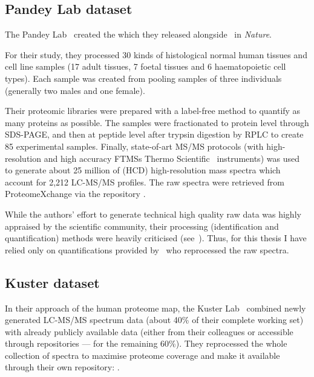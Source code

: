 \subsection{Pandey Lab dataset}

The Pandey Lab~ created the
 which
they released alongside~ in \emph{Nature}.

For their study, they processed 30 kinds of histological normal human
tissues and cell line samples (17 adult tissues, 7 foetal tissues and 6
haematopoietic cell types).
Each sample was created from pooling samples of three
individuals (generally two males and one female).

Their proteomic libraries were prepared with a label-free method to quantify
as many proteins as possible.
The samples were fractionated to protein level through \gls{SDS-PAGE},
and then at peptide level after trypsin digestion by \gls{RPLC}
to create 85 experimental samples.
Finally, state-of-art \gls{MS/MS} protocols
(with high-resolution and high accuracy
\glspl{FTMS} Thermo Scientific \orbi\ instruments)
was used to generate about 25 million of (\gls{HCD})
high-resolution mass spectra which account for 2,212 \gls{LC-MS/MS} profiles.
The raw spectra were retrieved from ProteomeXchange via the repository
.

While the authors' effort to generate technical high quality raw data was highly
appraised by the scientific community, their processing
(identification and quantification) methods were heavily
criticised (see~\citet{Ezkurdia2014-qx,Deutsch2015}).
Thus, for this thesis I have relied only on
quantifications provided by \james\ who reprocessed the raw spectra.

\subsection{Kuster dataset}

In their approach of the human proteome map, the Kuster Lab~
combined newly generated \gls{LC-MS/MS} spectrum data (about 40\% of their
complete working set) with already publicly available data
(either from their colleagues or accessible through repositories
--- for the remaining 60\%).
They reprocessed
the whole collection of spectra to maximise proteome coverage
and make it available through their own repository:
.

